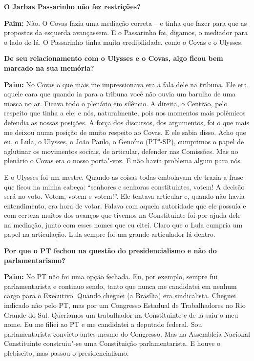 \textbf{O Jarbas Passarinho não fez restrições?}

\textbf{Paim:} Não. O Covas fazia uma mediação correta -- e tinha que
fazer para que as propostas da esquerda avançassem. E o Passarinho foi,
digamos, o mediador para o lado de lá. O Passarinho tinha muita
credibilidade, como o Covas e o Ulysses.

\textbf{De seu relacionamento com o Ulysses e o Covas, algo ficou bem
marcado na sua memória?}

\textbf{Paim:} No Covas o que mais me impressionava era a fala dele na
tribuna. Ele era aquele cara que quando ia para a tribuna você não ouvia
um barulho de uma mosca no ar. Ficava todo o plenário em silêncio. A
direita, o Centrão, pelo respeito que tinha a ele; e nós, naturalmente,
pois nos momentos mais polêmicos defendia as nossas posições. A força
dos discursos, dos argumentos, foi o que mais me deixou numa posição de
muito respeito ao Covas. E ele sabia disso. Acho que eu, o Lula, o
Ulysses, o João Paulo, o Genoíno (PT"-SP), cumprimos o papel de aglutinar
os movimentos sociais, de articular, defender nas Comissões. Mas no
plenário o Covas era o nosso porta"-voz. E não havia problema algum para
nós.

E o Ulysses foi um mestre. Quando as coisas todas embolavam ele trazia a
frase que ficou na minha cabeça: ``senhores e senhoras constituintes,
votem! A decisão será no voto. Votem, votem e votem!''. Ele tentava
articular e, quando não havia entendimento, era hora de votar. Falava
com aquela autoridade que ele possuía e com certeza muitos dos avanços
que tivemos na Constituinte foi por ajuda dele na mediação, junto com
esses nomes que eu citei. Claro que o Lula cumpria um papel na
articulação. Lula sempre foi um grande articulador lá dentro.

\textbf{Por que o PT fechou na questão do presidencialismo e não do
parlamentarismo?}

\textbf{Paim:} No PT não foi uma opção fechada. Eu, por exemplo, sempre
fui parlamentarista e continuo sendo, tanto que nunca me candidatei em
nenhum cargo para o Executivo. Quando cheguei (a Brasília) era
sindicalista. Cheguei indicado não pelo PT, mas por um Congresso
Estadual de Trabalhadores no Rio Grande do Sul. Queríamos um trabalhador
na Constituinte e de lá saiu o meu nome. Eu me filiei ao PT e me
candidatei a deputado federal. Sou parlamentarista convicto antes mesmo
do Congresso. Mas na Assembleia Nacional Constituinte construiu"-se uma
Constituição parlamentarista. E houve o plebiscito, mas passou o
presidencialismo.

